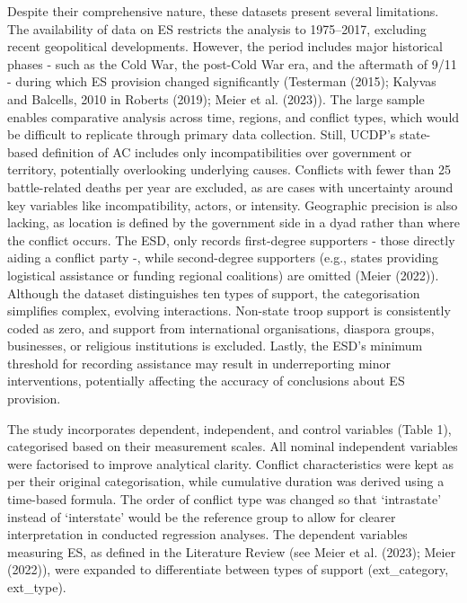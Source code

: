 \documentclass[
]{article}
\begin{document}
Despite their comprehensive nature, these datasets present several
limitations. The availability of data on ES restricts the analysis to
1975--2017, excluding recent geopolitical developments. However, the
period includes major historical phases - such as the Cold War, the
post-Cold War era, and the aftermath of 9/11 - during which ES provision
changed significantly (Testerman (2015); Kalyvas and Balcells, 2010 in
Roberts (2019); Meier et al. (2023)). The large sample enables
comparative analysis across time, regions, and conflict types, which
would be difficult to replicate through primary data collection. Still,
UCDP's state-based definition of AC includes only incompatibilities over
government or territory, potentially overlooking underlying causes.
Conflicts with fewer than 25 battle-related deaths per year are
excluded, as are cases with uncertainty around key variables like
incompatibility, actors, or intensity. Geographic precision is also
lacking, as location is defined by the government side in a dyad rather
than where the conflict occurs. The ESD, only records first-degree
supporters - those directly aiding a conflict party -, while
second-degree supporters (e.g., states providing logistical assistance
or funding regional coalitions) are omitted (Meier (2022)). Although the
dataset distinguishes ten types of support, the categorisation
simplifies complex, evolving interactions. Non-state troop support is
consistently coded as zero, and support from international
organisations, diaspora groups, businesses, or religious institutions is
excluded. Lastly, the ESD's minimum threshold for recording assistance
may result in underreporting minor interventions, potentially affecting
the accuracy of conclusions about ES provision.

The study incorporates dependent, independent, and control variables
(Table 1), categorised based on their measurement scales. All nominal
independent variables were factorised to improve analytical clarity.
Conflict characteristics were kept as per their original categorisation,
while cumulative duration was derived using a time-based formula. The
order of conflict type was changed so that `intrastate' instead of
`interstate' would be the reference group to allow for clearer
interpretation in conducted regression analyses. The dependent variables
measuring ES, as defined in the Literature Review (see Meier et al.
(2023); Meier (2022)), were expanded to differentiate between types of
support (ext\_category, ext\_type).
\end{document}
